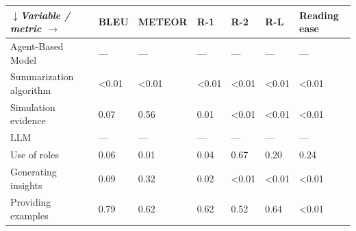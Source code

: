 \begin{tabular}{|l|l|l|l|l|l|l|}
\hline
\textit{$\downarrow$Variable / metric $\rightarrow$} & BLEU & METEOR & R-1 & R-2 & R-L & Reading ease \\
 \hline
 Agent-Based Model & — & — & — & — & — & — \\
 \hline
 Summarization algorithm & \textless{}0.01 & \textless{}0.01 & \textless{}0.01 & \textless{}0.01 & \textless{}0.01 & \textless{}0.01 \\
 \hline
 Simulation evidence & 0.07 & 0.56 & 0.01 & \textless{}0.01 & \textless{}0.01 & \textless{}0.01 \\
 \hline
 LLM & — & — & — & — & — & — \\
 \hline
 Use of roles & 0.06 & 0.01 & 0.04 & 0.67 & 0.20 & 0.24 \\
 \hline
 Generating insights & 0.09 & 0.32 & 0.02 & \textless{}0.01 & \textless{}0.01 & \textless{}0.01 \\
 \hline
 Providing examples & 0.79 & 0.62 & 0.62 & 0.52 & 0.64 & \textless{}0.01 \\
\hline
\end{tabular}
